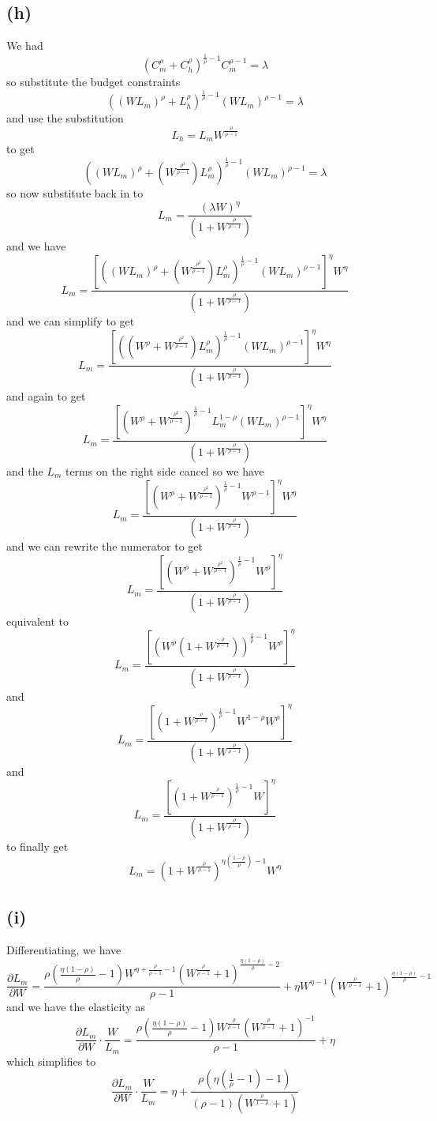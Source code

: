 \documentclass[11pt]{amsart}
\begin{document}
\subsection*{(h)}

We had
\[
\left( C_m^\rho + C_h^\rho \right)^{\frac{1}{\rho} -1}  C_m^{\rho-1} = \lambda
\]
so substitute the budget constraints
\[
((W L_m)^{\rho} + L_h^{\rho})^{\frac{1}{\rho} -1} (W L_m)^{\rho-1} = \lambda
\]
and use the substitution
\[
L_h = L_m W^{\frac{\rho}{\rho-1}}
\]
to get
\[
((W L_m)^{\rho} + ( W^{\frac{\rho^2}{\rho-1}}) L_m^{\rho})^{\frac{1}{\rho} -1} (W L_m)^{\rho-1} = \lambda
\]
so now substitute back in to
\[
L_m = \frac{(\lambda W)^{\eta}}{(1 + W^{\frac{\rho}{\rho-1}})}
\]
and we have
\[
L_m = \frac{ \left[((W L_m)^{\rho} + ( W^{\frac{\rho^2}{\rho-1}}) L_m^{\rho})^{\frac{1}{\rho} -1} (W L_m)^{\rho-1}\right]^{\eta} W^{\eta}}{(1 + W^{\frac{\rho}{\rho-1}})}
\]
and we can simplify to get
\[
L_m = \frac{ \left[((W^{\rho} + W^{\frac{\rho^2}{\rho-1}}) L_m^{\rho})^{\frac{1}{\rho} -1} (W L_m)^{\rho-1}\right]^{\eta} W^{\eta}}{(1 + W^{\frac{\rho}{\rho-1}})}
\]
and again to get
\[
L_m = \frac{ \left[(W^{\rho} + W^{\frac{\rho^2}{\rho-1}})^{\frac{1}{\rho} -1} L_m^{1-\rho} (W L_m)^{\rho-1}\right]^{\eta} W^{\eta}}{(1 + W^{\frac{\rho}{\rho-1}})}
\]
and the $L_m$ terms on the right side cancel so we have
\[
L_m = \frac{ \left[(W^{\rho} + W^{\frac{\rho^2}{\rho-1}})^{\frac{1}{\rho} -1}  W ^{\rho-1}\right]^{\eta} W^{\eta}}{(1 + W^{\frac{\rho}{\rho-1}})}
\]
and we can rewrite the numerator to get
\[
L_m = \frac{ \left[(W^{\rho} + W^{\frac{\rho^2}{\rho-1}})^{\frac{1}{\rho} -1}  W ^{\rho}\right]^{\eta} }{(1 + W^{\frac{\rho}{\rho-1}})}
\] 
equivalent to 
\[
L_m = \frac{ \left[(W^{\rho}(1 + W^{\frac{\rho}{\rho-1}}))^{\frac{1}{\rho} -1}  W ^{\rho}\right]^{\eta} }{(1 + W^{\frac{\rho}{\rho-1}})}
\] 
and
\[
L_m = \frac{ \left[(1 + W^{\frac{\rho}{\rho-1}})^{\frac{1}{\rho} -1}  W^{1-\rho} W ^{\rho}\right]^{\eta} }{(1 + W^{\frac{\rho}{\rho-1}})}
\] 
and
\[
L_m = \frac{ \left[(1 + W^{\frac{\rho}{\rho-1}})^{\frac{1}{\rho} -1}  W \right]^{\eta} }{(1 + W^{\frac{\rho}{\rho-1}})}
\] 
to finally get
\[
L_m = \left( 1 + W^{\frac{\rho}{\rho-1}} \right)^{\eta \left( \frac{1-\rho}{\rho} \right) -1} W^\eta
\]

\subsection*{(i)}

Differentiating, we have
\[
\frac{\partial L_m}{\partial W} = \frac{\rho  \left(\frac{\eta  (1-\rho )}{\rho }-1\right) W^{\eta +\frac{\rho }{\rho -1}-1} \left(W^{\frac{\rho }{\rho -1}}+1\right)^{\frac{\eta  (1-\rho )}{\rho }-2}}{\rho -1}+\eta  W^{\eta -1} \left(W^{\frac{\rho }{\rho -1}}+1\right)^{\frac{\eta  (1-\rho )}{\rho }-1}
\]
and we have the elasticity as
\[
\frac{\partial L_m}{\partial W} \cdot \frac{W}{ L_m} = \frac{\rho  \left(\frac{\eta  (1-\rho )}{\rho }-1\right) W^{\frac{\rho }{\rho -1}} \left(W^{\frac{\rho }{\rho -1}}+1\right)^{-1}}{\rho -1} + \eta 
\]
which simplifies to 
\[
\frac{\partial L_m}{\partial W} \cdot \frac{W}{ L_m} =  \eta +\frac{\rho  \left(\eta  \left(\frac{1}{\rho }-1\right)-1\right)}{(\rho -1) \left(W^{\frac{\rho }{1-\rho }}+1\right)}
\]
\end{document}
